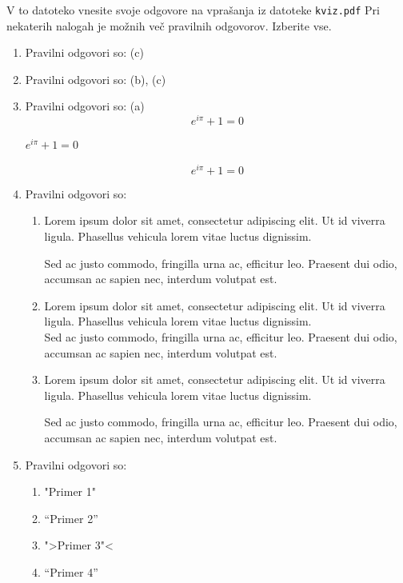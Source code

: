 \documentclass[11pt]{article}
\begin{document}
V to datoteko vnesite svoje odgovore na vprašanja iz datoteke \texttt{kviz.pdf}
Pri nekaterih nalogah je možnih več pravilnih odgovorov. Izberite vse.

\begin{enumerate}
    \item Pravilni odgovori so: (c) %
    
    \item Pravilni odgovori so: (b), (c) %
    
    \item Pravilni odgovori so: (a) %
      \[ e^{i \pi} + 1 = 0 \]
      \begin{center}
          \( e^{i \pi} + 1 = 0 \)
      \end{center}
      \begin{equation*}
          e^{i \pi} + 1 = 0
      \end{equation*}

    \item Pravilni odgovori so: %
        \begin{enumerate}
            \item {
Lorem ipsum dolor sit amet, consectetur adipiscing 
elit. Ut id viverra ligula. Phasellus vehicula lorem 
vitae luctus dignissim. 
                
Sed ac justo commodo, fringilla urna ac, efficitur 
leo. Praesent dui odio, accumsan ac sapien nec, 
interdum volutpat est. 
            }
            \item {
Lorem ipsum dolor sit amet, consectetur adipiscing 
elit. Ut id viverra ligula. Phasellus vehicula lorem 
vitae luctus dignissim. \\
Sed ac justo commodo, fringilla urna ac, efficitur 
leo. Praesent dui odio, accumsan ac sapien nec, 
interdum volutpat est.             }
            \item {
Lorem ipsum dolor sit amet, consectetur adipiscing 
elit. Ut id viverra ligula. Phasellus vehicula lorem 
vitae luctus dignissim. \par
Sed ac justo commodo, fringilla urna ac, efficitur 
leo. Praesent dui odio, accumsan ac sapien nec, 
interdum volutpat est.             }
        \end{enumerate}
    
      \item Pravilni odgovori so: %
        \begin{enumerate}
          \item "Primer 1"
          \item ``Primer 2''
          \item ">Primer 3"<
          \item "`Primer 4"'
        \end{enumerate}


\end{enumerate}
\end{document}
